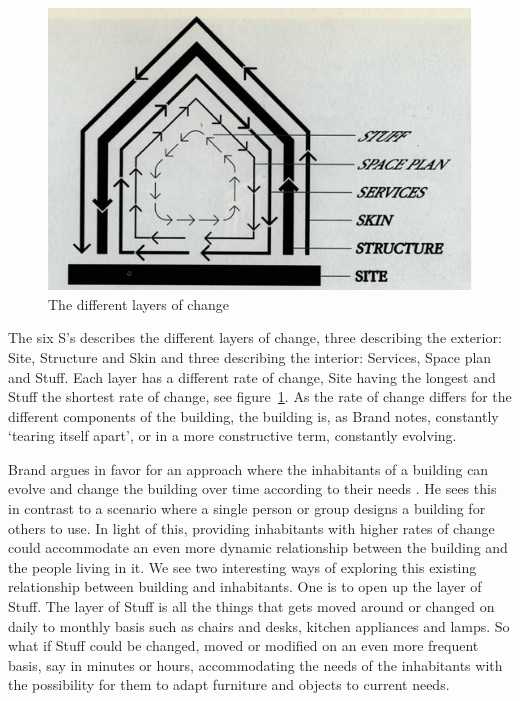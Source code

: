 \begin{figure}[h]
	\centering
  		\includegraphics[width=.9\textwidth]{figures/brand-diagram}
	\caption{The different layers of change \citep[chapter 2]{brand1995buildings}}
   \label{brand-diagram}
\end{figure}

The six S's describes the different layers of change, three describing the exterior: Site, Structure and Skin and three describing the interior: Services, Space plan and Stuff.
Each layer has a different rate of change, Site having the longest and Stuff the shortest rate of change, see figure~\ref{brand-diagram}.
As the rate of change differs for the different components of the building, the building is, as Brand notes, constantly `tearing itself apart', or in a more constructive term, constantly evolving.

Brand argues in favor for an approach where the inhabitants of a building can evolve and change the building over time according to their needs \citep{brandBBCvideo}.
He sees this in contrast to a scenario where a single person or group designs a building for others to use.
In light of this, providing inhabitants with higher rates of change could accommodate an even more dynamic relationship between the building and the people living in it.
\blank
We see two interesting ways of exploring this existing relationship between building and inhabitants.
One is to open up the layer of Stuff.
The layer of Stuff is all the things that gets moved around or changed on daily to monthly basis such as chairs and desks, kitchen appliances and lamps.
So what if Stuff could be changed, moved or modified on an even more frequent basis, say in minutes or hours, accommodating the needs of the inhabitants with the possibility for them to adapt furniture and objects to current needs.

